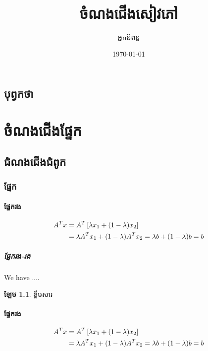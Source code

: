 \documentclass[a4paper,12pt,twoside]{book}
\title{\KhOSML ចំណងជើងសៀវភៅ}
\author{ អ្នកនិពន្វ}
\date{\today}
\newcommand{\KhOSML}{\fontspec[Script=Khmer]{Khmer OS Muol Light} \selectfont}
\theoremstyle{plain}
\theoremstyle{definition}
\newtheorem{lemma}{\KhOSML ឡែម}[definition]%
\theoremstyle{remark}
\begin{document}
\setcounter{secnumdepth}{3} %
\setcounter{tocdepth}{3} %

\frontmatter

\maketitle

\tableofcontents

\listoffigures
{}

\listoftables
{}

\chapter{បុព្វកថា}

\mainmatter

\part{ចំណងជើងផ្នែក}

\chapter{ជំណងជើងជំពូក}

\section{ផ្នែក}

\subsection{ផ្នែករង}
\begin{align}
A^T x &= A^T\left[\lambda x_1 + (1-\lambda)x_2\right] \notag\\
&= \lambda A^T x_1 + (1-\lambda)A^T x_2 = 
\lambda b + (1-\lambda)b = b
\end{align}


\subsubsection{ផ្នែករង-រង}
We have ....

\begin{lemma}
ខ្លឹមសារ
\subsection{ផ្នែករង}
\begin{align}
A^T x &= A^T\left[\lambda x_1 + (1-\lambda)x_2\right] \notag\\
&= \lambda A^T x_1 + (1-\lambda)A^T x_2 = 
\lambda b + (1-\lambda)b = b
\end{align}
\end{lemma}
\end{document}
